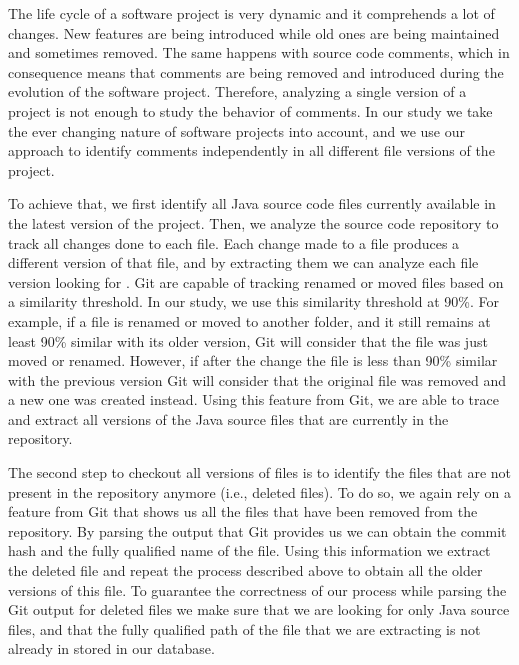 The life cycle of a software project is very dynamic and it comprehends a lot of changes. New features are being introduced while old ones are being maintained and sometimes removed. The same happens with source code comments, which in consequence means that \SATD comments are being removed and introduced during the evolution of the software project. Therefore, analyzing a single version of a project is not enough to study the behavior of \SATD comments. In our study we take the ever changing nature of software projects into account, and we use our approach to identify \SATD comments independently in all different file versions of the project.

To achieve that, we first identify all Java source code files currently available in the latest version of the project. Then, we analyze the source code repository to track all changes done to each file. Each change made to a file produces a different version of that file, and by extracting them we can analyze each file version looking for \SATD. Git are capable of tracking  renamed or moved files based on a similarity threshold. In our study, we use this similarity threshold at 90\%. For example, if a file is renamed or moved to another folder, and it still remains at least 90\% similar with its older version, Git will consider that the file was just moved or renamed. However, if after the change the file is less than 90\% similar with the previous version Git will consider that the original file was removed and a new one was created instead. Using this feature from Git, we are able to trace and extract all versions of the Java source files that are currently in the repository. 

The second step to checkout all versions of files is to identify the files that are not present in the repository anymore (i.e., deleted files). To do so, we again rely on a feature from Git that shows us all the files that have been removed from the repository. By parsing the output that Git provides us we can obtain the commit hash and the fully qualified name of the file. Using this information we extract the deleted file and repeat the process described above to obtain all the older versions of this file. To guarantee the correctness of our process while parsing the Git output for deleted files we make sure that we are looking for only Java source files, and that the fully qualified path of the file that we are extracting is not already in stored in our database. 

